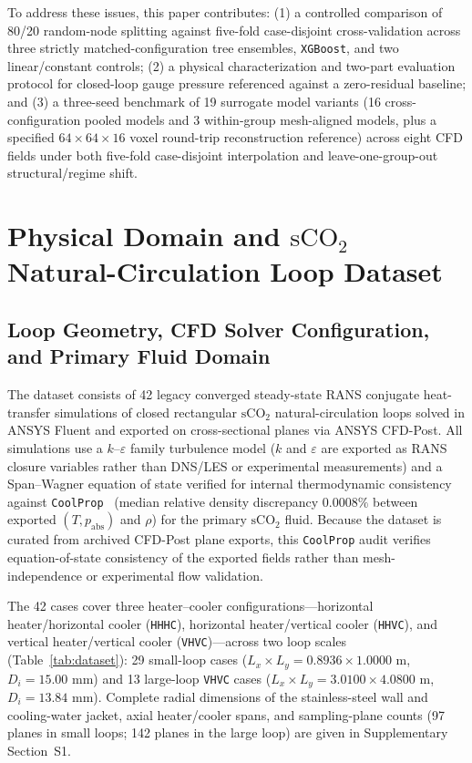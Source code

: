\documentclass[11pt]{article}
\begin{document}
To address these issues, this paper contributes: (1) a controlled comparison of 80/20 random-node splitting against five-fold case-disjoint cross-validation across three strictly matched-configuration tree ensembles, \texttt{XGBoost}, and two linear/constant controls; (2) a physical characterization and two-part evaluation protocol for closed-loop gauge pressure referenced against a zero-residual baseline; and (3) a three-seed benchmark of 19 surrogate model variants (16 cross-configuration pooled models and 3 within-group mesh-aligned models, plus a specified $64\times 64\times 16$ voxel round-trip reconstruction reference) across eight CFD fields under both five-fold case-disjoint interpolation and leave-one-group-out structural/regime shift.

\section{Physical Domain and $\mathrm{sCO}_2$ Natural-Circulation Loop Dataset}
\subsection{Loop Geometry, CFD Solver Configuration, and Primary Fluid Domain}
The dataset consists of 42 legacy converged steady-state RANS conjugate heat-transfer simulations of closed rectangular $\mathrm{sCO}_2$ natural-circulation loops solved in ANSYS Fluent and exported on cross-sectional planes via ANSYS CFD-Post. All simulations use a $k$--$\varepsilon$ family turbulence model ($k$ and $\varepsilon$ are exported as RANS closure variables rather than DNS/LES or experimental measurements) and a Span--Wagner equation of state verified for internal thermodynamic consistency against \texttt{CoolProp}~\cite{span1996new,bell2014pure} (median relative density discrepancy $0.0008\%$ between exported $(T, p_{\mathrm{abs}})$ and $\rho$) for the primary $\mathrm{sCO}_2$ fluid. Because the dataset is curated from archived CFD-Post plane exports, this \texttt{CoolProp} audit verifies equation-of-state consistency of the exported fields rather than mesh-independence or experimental flow validation.

The 42 cases cover three heater--cooler configurations---horizontal heater/horizontal cooler (\texttt{HHHC}), horizontal heater/vertical cooler (\texttt{HHVC}), and vertical heater/vertical cooler (\texttt{VHVC})---across two loop scales (Table~\ref{tab:dataset}): 29 small-loop cases ($L_x \times L_y = 0.8936 \times 1.0000\text{ m}$, $D_i = 15.00\text{ mm}$) and 13 large-loop \texttt{VHVC} cases ($L_x \times L_y = 3.0100 \times 4.0800\text{ m}$, $D_i = 13.84\text{ mm}$). Complete radial dimensions of the stainless-steel wall and cooling-water jacket, axial heater/cooler spans, and sampling-plane counts (97 planes in small loops; 142 planes in the large loop) are given in Supplementary Section~S1.
\end{document}
